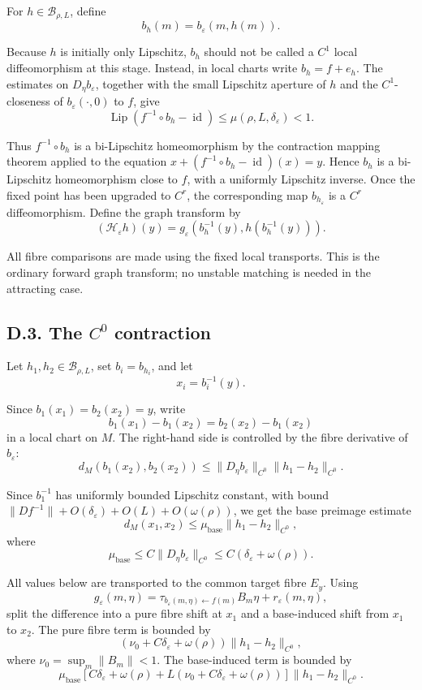 \documentclass[12pt,a4paper]{article}
\theoremstyle{plain}
\numberwithin{equation}{section}
\numberwithin{theorem}{section}
\begin{document}
For $h\in\mathcal B_{\rho,L}$, define
\[
b_h(m)=b_\varepsilon(m,h(m)).
\]

Because $h$ is initially only Lipschitz, $b_h$ should not be called a $C^1$ local diffeomorphism at this stage. Instead, in local charts write $b_h=f+e_h$. The estimates on $D_\eta b_\varepsilon$, together with the small Lipschitz aperture of $h$ and the $C^1$-closeness of $b_\varepsilon(\cdot,0)$ to $f$, give
\[
\operatorname{Lip}(f^{-1}\circ b_h-\operatorname{id})
\le \mu(\rho,L,\delta_\varepsilon)<1.
\]

Thus $f^{-1}\circ b_h$ is a bi-Lipschitz homeomorphism by the contraction mapping theorem applied to the equation $x+(f^{-1}\circ b_h-\operatorname{id})(x)=y$. Hence $b_h$ is a bi-Lipschitz homeomorphism close to $f$, with a uniformly Lipschitz inverse. Once the fixed point has been upgraded to $C^r$, the corresponding map $b_{h_\varepsilon}$ is a $C^r$ diffeomorphism. Define the graph transform by
\[
(\mathcal H_\varepsilon h)(y)
=
g_\varepsilon(b_h^{-1}(y),h(b_h^{-1}(y))).
\]

All fibre comparisons are made using the fixed local transports. This is the ordinary forward graph transform; no unstable matching is needed in the attracting case.

\subsection{D.3. The $C^0$ contraction}

Let $h_1,h_2\in\mathcal B_{\rho,L}$, set $b_i=b_{h_i}$, and let
\[
x_i=b_i^{-1}(y).
\]

Since $b_1(x_1)=b_2(x_2)=y$, write
\[
b_1(x_1)-b_1(x_2)=b_2(x_2)-b_1(x_2)
\]
in a local chart on $M$. The right-hand side is controlled by the fibre derivative of $b_\varepsilon$:
\[
d_M(b_1(x_2),b_2(x_2))
\le
\|D_\eta b_\varepsilon\|_{C^0}
\|h_1-h_2\|_{C^0}.
\]

Since $b_1^{-1}$ has uniformly bounded Lipschitz constant, with bound $\|Df^{-1}\|+O(\delta_\varepsilon)+O(L)+O(\omega(\rho))$, we get the base preimage estimate
\[
d_M(x_1,x_2)
\le
\mu_{\mathrm{base}}
\|h_1-h_2\|_{C^0},
\]
where
\[
\mu_{\mathrm{base}}
\le
C\|D_\eta b_\varepsilon\|_{C^0}
\le
C(\delta_\varepsilon+\omega(\rho)).
\]

All values below are transported to the common target fibre $E_y$. Using
\[
g_\varepsilon(m,\eta)=
\tau_{b_\varepsilon(m,\eta)\leftarrow f(m)}B_m\eta+r_\varepsilon(m,\eta),
\]
split the difference into a pure fibre shift at $x_1$ and a base-induced shift from $x_1$ to $x_2$. The pure fibre term is bounded by
\[
\left(\nu_0+C\delta_\varepsilon+\omega(\rho)\right)
\|h_1-h_2\|_{C^0},
\]
where $\nu_0=\sup_m\|B_m\|<1$. The base-induced term is bounded by
\[
\mu_{\mathrm{base}}
\left[
C\delta_\varepsilon+\omega(\rho)
+L(\nu_0+C\delta_\varepsilon+\omega(\rho))
\right]
\|h_1-h_2\|_{C^0}.
\]
\end{document}
